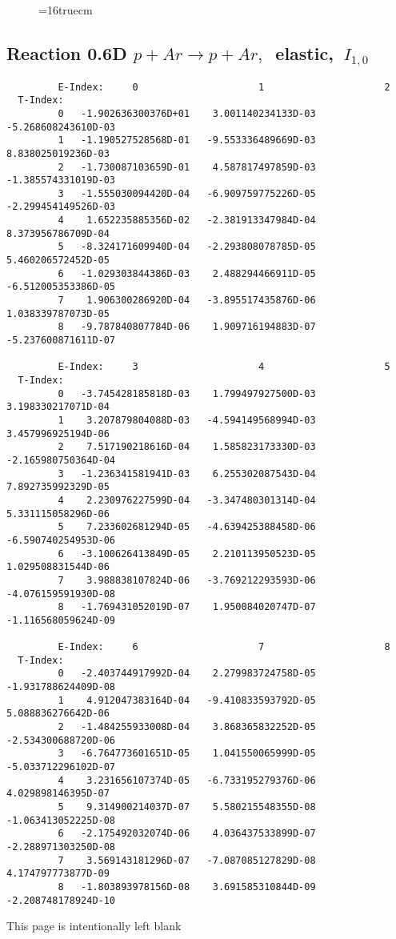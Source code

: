 \documentclass[12pt,dvipdfmx]{article}
\begin{document}
\begin{figure} \label{0.6T}
\epsfxsize=16truecm
\end{figure}
\newpage

\subsection{
Reaction 0.6D  $p + Ar \rightarrow p + Ar ,\ $
 elastic, $\  I_{1,0}$
}

\begin{small}\begin{verbatim}
         E-Index:     0                     1                     2
  T-Index:
         0   -1.902636300376D+01    3.001140234133D-03   -5.268608243610D-03
         1   -1.190527528568D-01   -9.553336489669D-03    8.838025019236D-03
         2   -1.730087103659D-01    4.587817497859D-03   -1.385574331019D-03
         3   -1.555030094420D-04   -6.909759775226D-05   -2.299454149526D-03
         4    1.652235885356D-02   -2.381913347984D-04    8.373956786709D-04
         5   -8.324171609940D-04   -2.293808078785D-05    5.460206572452D-05
         6   -1.029303844386D-03    2.488294466911D-05   -6.512005353386D-05
         7    1.906300286920D-04   -3.895517435876D-06    1.038339787073D-05
         8   -9.787840807784D-06    1.909716194883D-07   -5.237600871611D-07

         E-Index:     3                     4                     5
  T-Index:
         0   -3.745428185818D-03    1.799497927500D-03    3.198330217071D-04
         1    3.207879804088D-03   -4.594149568994D-03    3.457996925194D-06
         2    7.517190218616D-04    1.585823173330D-03   -2.165980750364D-04
         3   -1.236341581941D-03    6.255302087543D-04    7.892735992329D-05
         4    2.230976227599D-04   -3.347480301314D-04    5.331115058296D-06
         5    7.233602681294D-05   -4.639425388458D-06   -6.590740254953D-06
         6   -3.100626413849D-05    2.210113950523D-05    1.029508831544D-06
         7    3.988838107824D-06   -3.769212293593D-06   -4.076159591930D-08
         8   -1.769431052019D-07    1.950084020747D-07   -1.116568059624D-09

         E-Index:     6                     7                     8
  T-Index:
         0   -2.403744917992D-04    2.279983724758D-05   -1.931788624409D-08
         1    4.912047383164D-04   -9.410833593792D-05    5.088836276642D-06
         2   -1.484255933008D-04    3.868365832252D-05   -2.534300688720D-06
         3   -6.764773601651D-05    1.041550065999D-05   -5.033712296102D-07
         4    3.231656107374D-05   -6.733195279376D-06    4.029898146395D-07
         5    9.314900214037D-07    5.580215548355D-08   -1.063413052225D-08
         6   -2.175492032074D-06    4.036437533899D-07   -2.288971303250D-08
         7    3.569143181296D-07   -7.087085127829D-08    4.174797773877D-09
         8   -1.803893978156D-08    3.691585310844D-09   -2.208748178924D-10

\end{verbatim}\end{small}
\newpage
This page is intentionally left blank
\newpage
\end{document}
